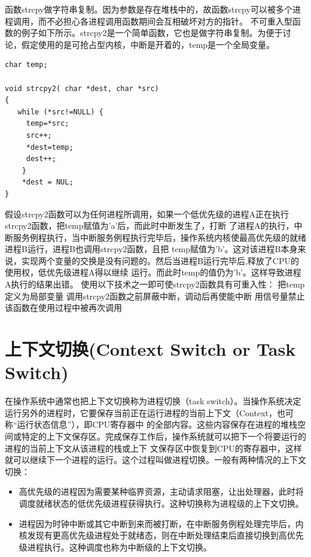 \documentclass[a4paper,12pt]{report}
\begin{document}
\begin{appendix}
\begin{spacing}{1.5}
\begin{lstlisting}
\end{lstlisting}

         函数strcpy做字符串复制。因为参数是存在堆栈中的，故函数strcpy可以被多个进程调用，而不必担心各进程调用函数期间会互相破坏对方的指针。
    不可重入型函数的例子如下所示。strcpy2是一个简单函数，它也是做字符串复制。为便于讨论，假定使用的是可抢占型内核，中断是开着的，temp是一个全局变量。
 \begin{lstlisting}
char temp;

void strcpy2( char *dest, char *src)
{
   while (*src!=NULL) {
     temp=*src;
     src++;
     *dest=temp;
     dest++;
    }
    *dest = NUL;
}
\end{lstlisting}

 假设strcpy2函数可以为任何进程所调用，如果一个低优先级的进程A正在执行strcpy2函数，把temp赋值为'a'后，而此时中断发生了，打断 了进程A的执行，中断服务例程执行，当中断服务例程执行完毕后，操作系统内核使最高优先级的就绪进程B运行，进程B也调用strcpy2函数，且把 temp赋值为'b'。这对该进程B本身来说，实现两个变量的交换是没有问题的。然后当进程B运行完毕后,释放了CPU的使用权，低优先级进程A得以继续 运行。而此时temp的值仍为'b'。这样导致进程A执行的结果出错。
    使用以下技术之一即可使strcpy2函数具有可重入性：
把temp定义为局部变量
调用strcpy2函数之前屏蔽中断，调动后再使能中断
用信号量禁止该函数在使用过程中被再次调用

\end{spacing}



\section{ 上下文切换(Context Switch or Task Switch)}
\begin{spacing}{1.5}

      在操作系统中通常也把上下文切换称为进程切换（task switch）。当操作系统决定运行另外的进程时，它要保存当前正在运行进程的当前上下文（Context，也可称“运行状态信息”），即CPU寄存器中 的全部内容。这些内容保存在进程的堆栈空间或特定的上下文保存区。完成保存工作后，操作系统就可以把下一个将要运行的进程的当前上下文从该进程的栈或上下 文保存区中恢复到CPU的寄存器中，这样就可以继续下一个进程的运行。这个过程叫做进程切换。一般有两种情况的上下文切换：
      \begin{itemize}
        \item 高优先级的进程因为需要某种临界资源，主动请求阻塞，让出处理器，此时将调度就绪状态的低优先级进程获得执行。这种切换称为进程级的上下文切换。
        \item 进程因为时钟中断或其它中断到来而被打断，在中断服务例程处理完毕后，内核发现有更高优先级进程处于就绪态，则在中断处理结束后直接切换到高优先级进程执行。这种调度也称为中断级的上下文切换。
      \end{itemize}
\end{spacing}


\end{appendix}
\end{document}
